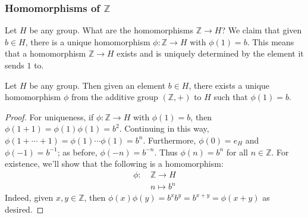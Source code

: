 \documentclass{article}
\theoremstyle{plain}
\newcommand{\Z}{\mathbb{Z}}
\begin{document}
\subsubsection{Homomorphisms of $\Z$}
Let $H$ be any group. What are the homomorphisms $\Z \rightarrow H$? We claim that given $b \in H$, there is a unique homomorphism $\phi : \Z \rightarrow H$ with $\phi(1) = b$. This means that a homomorphism $\Z \rightarrow H$ exists and is uniquely determined by the element it sends $1$ to.
\begin{theorem}{}{}
Let $H$ be any group. Then given an element $b \in H$, there exists a unique homomorphism $\phi$ from the additive group $(\Z,+)$ to $H$ such that $\phi(1) = b$.
\end{theorem}
\begin{proof}
For uniqueness, if $\phi : \Z \rightarrow H$ with $\phi(1) = b$, then $\phi(1 + 1) = \phi(1)\phi(1) = b^2$. Continuing in this way, $\phi(1 + \cdots + 1) = \phi(1) \cdots \phi(1) = b^n$. Furthermore, $\phi(0) = e_H$ and $\phi(-1) = b^{-1}$; as before, $\phi(-n) = b^{-n}$. Thus $\phi(n) = b^n$ for all $n \in \Z$. For existence, we'll show that the following is a homomorphism:
\begin{align*}
\phi : \ &\Z \rightarrow H \\
&n \mapsto b^n
\end{align*}
Indeed, given $x,y \in \Z$, then $\phi(x)\phi(y) = b^xb^y = b^{x+y} = \phi(x+y)$ as desired.
\end{proof}
\end{document}

